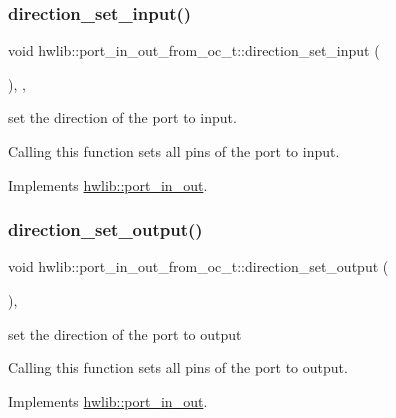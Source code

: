 \subsubsection{\texorpdfstring{direction\+\_\+set\+\_\+input()}{direction\_set\_input()}}
{\footnotesize\ttfamily void hwlib\+::port\+\_\+in\+\_\+out\+\_\+from\+\_\+oc\+\_\+t\+::direction\+\_\+set\+\_\+input (\begin{DoxyParamCaption}{ }\end{DoxyParamCaption})\hspace{0.3cm}{\ttfamily [inline]}, {\ttfamily [override]}, {\ttfamily [virtual]}}

set the direction of the port to input.

Calling this function sets all pins of the port to input. 

Implements \hyperlink{classhwlib_1_1port__in__out_ac7a9611410ddb9fd5d8e2dd15bff0a3f}{hwlib\+::port\+\_\+in\+\_\+out}.

\mbox{\label{classhwlib_1_1port__in__out__from__oc__t_ab4cd56460a6627c3fc7f39cb2e78a9c8}} 
\subsubsection{\texorpdfstring{direction\+\_\+set\+\_\+output()}{direction\_set\_output()}}
{\footnotesize\ttfamily void hwlib\+::port\+\_\+in\+\_\+out\+\_\+from\+\_\+oc\+\_\+t\+::direction\+\_\+set\+\_\+output (\begin{DoxyParamCaption}{ }\end{DoxyParamCaption})\hspace{0.3cm}{\ttfamily [inline]}, {\ttfamily [virtual]}}

set the direction of the port to output

Calling this function sets all pins of the port to output. 

Implements \hyperlink{classhwlib_1_1port__in__out_a515b4a6bbde4f2df5bb11cda41234fe4}{hwlib\+::port\+\_\+in\+\_\+out}.

\mbox{\label{classhwlib_1_1port__in__out__from__oc__t_aed77890fb29c1b3e5991786e8bd419d5}} 
